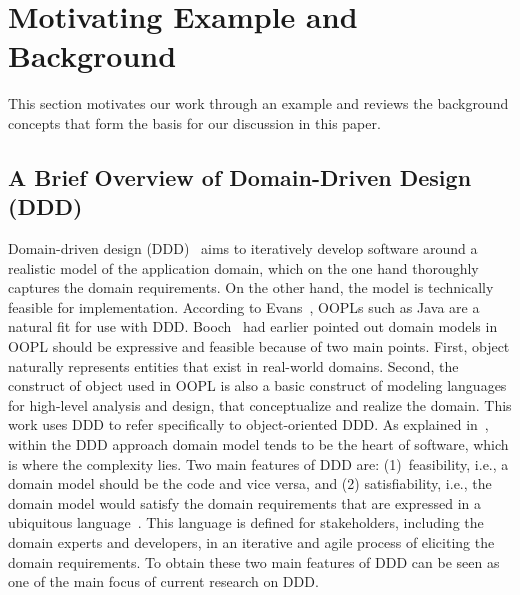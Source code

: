 \section{Motivating Example and Background} \label{sect:background}

This section motivates our work through an example and reviews the background concepts that form the basis for our discussion in this paper.

\subsection{A Brief Overview of Domain-Driven Design (DDD)}
\label{sect:bg-arch} %

Domain-driven design (DDD)~\cite{evans_domain-driven_2004} aims to iteratively develop software around a realistic model of the application domain, which on the one hand thoroughly captures the domain requirements. On the other hand, the model is technically feasible for implementation. According to Evans~\cite{evans_domain-driven_2004}, OOPLs such as Java are a natural fit for use with DDD. Booch~\cite{booch_object-oriented_1986} had earlier pointed out domain models in OOPL should be expressive and feasible because of two main points. First, object naturally represents entities that exist in real-world domains. Second, the construct of object used in OOPL is also a basic construct of modeling languages for high-level analysis and design, that conceptualize and realize the domain. This work uses DDD to refer specifically to object-oriented DDD. As explained in~\cite{evans_domain-driven_2004}, within the DDD approach domain model tends to be the heart of software, which is where the complexity lies. Two main features of DDD are: (1)~feasibility, i.e., a domain model should be the code and vice versa, and (2) satisfiability, i.e., the domain model would satisfy the domain requirements that are expressed in a ubiquitous language~\cite{evans_domain-driven_2004}. This language is defined for stakeholders, including the domain experts and developers, in an iterative and agile process of eliciting the domain requirements. To obtain these two main features of DDD can be seen as one of the main focus of current research on DDD. 


